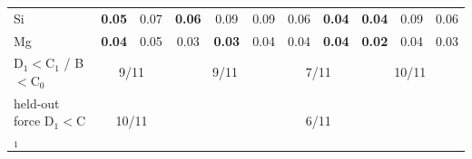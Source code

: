 \begin{table}[t]
\begin{ruledtabular}
\begin{tabular}{lcccccccccc}
Si & \textbf{0.05} & 0.07 & \textbf{0.06} & 0.09 & 0.09 & 0.06 & \textbf{0.04} & \textbf{0.04} & 0.09 & 0.06\\
Mg & \textbf{0.04} & 0.05 & 0.03 & \textbf{0.03} & 0.04 & 0.04 & \textbf{0.04} & \textbf{0.02} & 0.04 & 0.03\\
\hline
D$_1<$C$_1$ / B$<$C$_0$ & \multicolumn{2}{c}{9/11} & \multicolumn{3}{c}{9/11} & \multicolumn{2}{c}{7/11} & \multicolumn{3}{c}{10/11}\\
held-out force D$_1<$C$_1$ & \multicolumn{2}{c}{10/11} & \multicolumn{3}{c}{} & \multicolumn{2}{c}{6/11} & \multicolumn{3}{c}{}\\
\end{tabular}
\end{ruledtabular}
\end{table}
